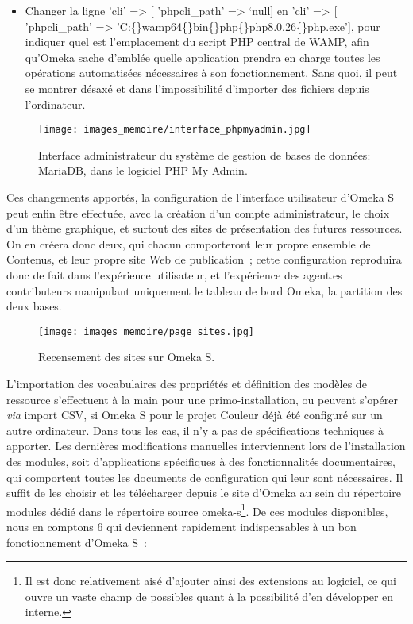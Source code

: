 \documentclass[a4paper,12pt, twoside]{book}
\begin{document}
\begin{itemize}
\begin{itemize}
        \item Changer la ligne \textsf{\textcolor{graycode}{'cli' => [ 'phpcli\_path' =>  ‘null]}} en \textsf{\textcolor{graycode}{'cli' => [ 'phpcli\_path' => 'C:\{\}wamp64\{\}bin\{\}php\{\}php8.0.26\{\}php.exe']}}, pour indiquer quel est l’emplacement du script PHP central de WAMP, afin qu’Omeka sache d’emblée quelle application prendra en charge toutes les opérations automatisées nécessaires à son fonctionnement. Sans quoi, il peut se montrer désaxé et dans l’impossibilité d’importer des fichiers depuis l’ordinateur.
    \end{itemize}     
\end{itemize}

\begin{figure}[!h]
    \centering
    \texttt{[image: images\_memoire/interface\_phpmyadmin.jpg]}
    \caption*{Interface administrateur du système de gestion de bases de données: MariaDB, dans le logiciel PHP My Admin.}
    \label{Interface de PHP My Admin}
\end{figure}

Ces changements apportés, la configuration de l’interface utilisateur d’Omeka S peut enfin être effectuée, avec la création d’un compte administrateur, le choix d’un thème graphique, et surtout des sites de présentation des futures ressources. On en créera donc deux, qui chacun comporteront leur propre ensemble de Contenus, et leur propre site Web de publication~; cette configuration reproduira donc de fait dans l’expérience utilisateur, et l’expérience des agent.es contributeurs manipulant uniquement le tableau de bord Omeka, la partition des deux bases.

\begin{figure}[!h]
    \centering
    \texttt{[image: images\_memoire/page\_sites.jpg]}
    \caption*{Recensement des sites sur Omeka S.}
    \label{Sites Omeka S}
\end{figure}

L’importation des vocabulaires des propriétés et définition des modèles de ressource s’effectuent à la main pour une primo-installation, ou peuvent s’opérer \textit{via} import CSV, si Omeka S pour le projet Couleur déjà été configuré sur un autre ordinateur. Dans tous les cas, il n’y a pas de spécifications techniques à apporter. Les dernières modifications manuelles interviennent lors de l’installation des modules, soit d’applications spécifiques à des fonctionnalités documentaires, qui comportent toutes les documents de configuration qui leur sont nécessaires. Il suffit de les choisir et les télécharger depuis le site d’Omeka au sein du répertoire \textsf{modules} dédié dans le répertoire source \textsf{omeka-s}\footnote{Il est donc relativement aisé d’ajouter ainsi des extensions au logiciel, ce qui ouvre un vaste champ de possibles quant à la possibilité d’en développer en interne.}. De ces modules disponibles, nous en comptons 6 qui deviennent rapidement indispensables à un bon fonctionnement d’Omeka S~:
\end{document}
